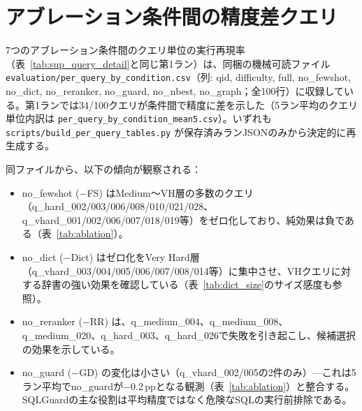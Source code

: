 \documentclass[twocolumn]{interact}
\makeatletter
\def\midrule{\noalign{\ifnum0=`}\fi
  \@aboverulesep=\aboverulesep
  \global\@belowrulesep=\belowrulesep
  \global\@thisruleclass=\@ne
  \@ifnextchar[{\@BTrule}{\@BTrule[\lightrulewidth]}}
\def\bottomrule{\noalign{\ifnum0=`}\fi
  \@aboverulesep=\aboverulesep
  \global\@belowrulesep=\belowbottomsep
  \global\@thisruleclass=\@ne
  \@ifnextchar[{\@BTrule}{\@BTrule[\heavyrulewidth]}}
\makeatother
\begin{document}
\begin{table}[htbp]
\end{table}
\section{アブレーション条件間の精度差クエリ}

\label{sec:sup_ablation_diff}

7つのアブレーション条件間のクエリ単位の実行再現率（表~\ref{tab:sup_query_detail}と同じ第1ラン）は、同梱の機械可読ファイル \texttt{evaluation/per\_query\_by\_condition.csv}（列: qid, difficulty, full, no\_fewshot, no\_dict, no\_reranker, no\_guard, no\_nbest, no\_graph；全100行）に収録している。第1ランでは34/100クエリが条件間で精度に差を示した（5ラン平均のクエリ単位内訳は \texttt{per\_query\_by\_condition\_mean5.csv}）。いずれも \texttt{scripts/build\_per\_query\_tables.py} が保存済みランJSONのみから決定的に再生成する。

同ファイルから、以下の傾向が観察される：
\begin{itemize}
  \item no\_fewshot ($-$FS) はMedium〜VH層の多数のクエリ（q\_hard\_002/003/006/008/010/021/028、q\_vhard\_001/002/006/007/018/019等）をゼロ化しており、純効果は負である（表~\ref{tab:ablation}）。
  \item no\_dict ($-$Dict) はゼロ化をVery Hard層（q\_vhard\_003/004/005/006/007/008/014等）に集中させ、VHクエリに対する辞書の強い効果を確認している（表~\ref{tab:dict_size}のサイズ感度も参照）。
  \item no\_reranker ($-$RR) は、q\_medium\_004、q\_medium\_008、q\_medium\_020、q\_hard\_003、q\_hard\_026で失敗を引き起こし、候補選択の効果を示している。
  \item no\_guard ($-$GD) の変化は小さい（q\_vhard\_002/005の2件のみ）---これは5ラン平均でno\_guardが$-$0.2\,ppとなる観測（表~\ref{tab:ablation}）と整合する。SQLGuardの主な役割は平均精度ではなく危険なSQLの実行前排除である。
\end{itemize}
\end{document}
